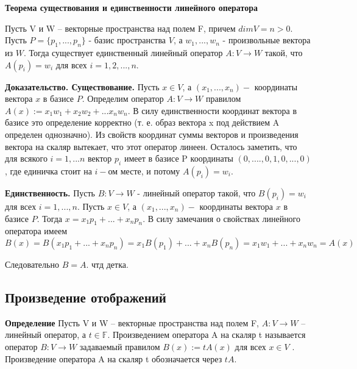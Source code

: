 \documentclass[a4paper]{article}
\begin{document}
    \begin{htheorem}
        \textbf{Теорема существования и единственности линейного оператора}

        Пусть V и W – векторные пространства над полем F, причем $dim V = n > 0$. Пусть $P = \{ p_1, ..., p_n \}$ - базис пространства $V$, а $w_1, ..., w_n$ - произвольные вектора из $W$. Тогда существует
        единственный линейный оператор $A: V \rightarrow W$ такой, что $A(p_i) = w_i$ для всех $i = 1, 2, ..., n$.
    \end{htheorem}


    \begin{hproof}
        \textbf{Доказательство. Существование.} Пусть $x \in V$, а $(x_1, ..., x_n) - $ координаты вектора $x$ в базисе $P$. Определим оператор $A: V \rightarrow W$ правилом $A(x) := x_1w_1+x_2w_2+...x_nw_n$. В силу единственности координат вектора в базисе это определение корректно (т. е. образ вектора x под действием A определен однозначно). Из свойств координат суммы векторов и произведения вектора на скаляр вытекает, что этот оператор
        линеен. Осталось заметить, что для всякого $i = 1,...n$ вектор $p_i$ имеет в базисе P координаты $(0,....,0,1,0,...,0)$, где единичка стоит на $i-$ом месте, и потому $A(p_i) = w_i$.

        \textbf{Единственность.} Пусть $B: V \rightarrow W$ - линейный оператор такой, что $B(p_i) = w_i$ для всех $i = 1,...,n$. Пусть $x \in V$, а $(x_1, ..., x_n) - $ координаты вектора $x$ в базисе $P$. Тогда $x = x_1p_1 + ... + x_np_n$. В силу замечания о свойствах линейного оператора имеем
        \begin{equation}
            B(x) = B(x_1p_1 + ... + x_np_n) = x_1B(p_1) + ... + x_nB(p_n) = x_1w_1 + ... + x_nw_n = A(x)
        \end{equation}

        Следовательно $B=A$. чтд детка.
    \end{hproof}



    \subsection*{Произведение отображений}
    \textbf{Определение} Пусть V и W – векторные пространства над полем F, $A: V \rightarrow W$ –
    линейный оператор, а $t \in \mathbb{F}$. Произведением оператора A на скаляр t
    называется оператор $B: V \rightarrow W$ задаваемый правилом $B(x) := tA(x)$ для
    всех $x \in V$ . Произведение оператора A на скаляр t обозначается через $tA$.
\end{document}
